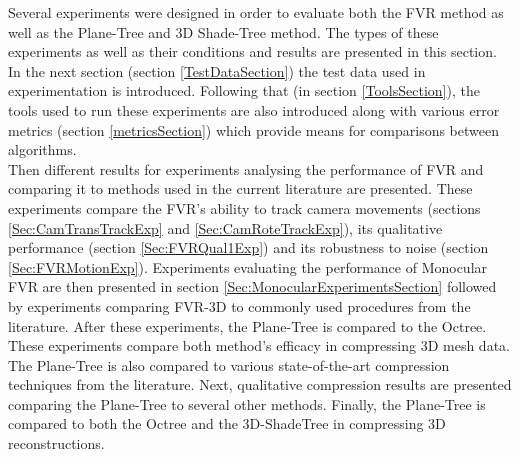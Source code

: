Several experiments were designed in order to evaluate both the FVR method as well as the Plane-Tree and 3D Shade-Tree method. The types of these experiments as well as their conditions and results are presented in this section. In the next section (section \ref{TestDataSection}) the test data used in experimentation is introduced. Following that (in section \ref{ToolsSection}), the tools used to run these experiments are also introduced along with various error metrics (section \ref{metricsSection}) which provide means for comparisons between algorithms. \\

Then different results for experiments analysing the performance of FVR and comparing it to methods used in the current literature are presented. These experiments compare the FVR's ability to track camera movements (sections \ref{Sec:CamTransTrackExp} and \ref{Sec:CamRoteTrackExp}), its qualitative performance (section \ref{Sec:FVRQual1Exp}) and its robustness to noise (section \ref{Sec:FVRMotionExp}). Experiments evaluating the performance of Monocular FVR are then presented in section \ref{Sec:MonocularExperimentsSection} followed by experiments comparing FVR-3D to commonly used procedures from the literature. After these experiments, the Plane-Tree is compared to the Octree. These experiments compare both method's efficacy in compressing 3D mesh data. The Plane-Tree is also compared to various state-of-the-art compression techniques from the literature. Next, qualitative compression results are presented comparing the Plane-Tree to several other methods. Finally, the Plane-Tree is compared to both the Octree and the 3D-ShadeTree in compressing 3D reconstructions. \\
